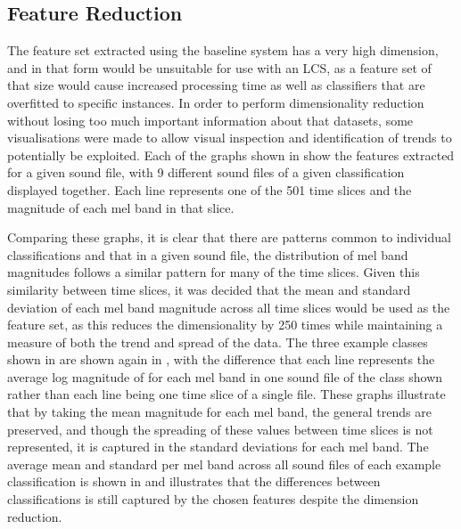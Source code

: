 \documentclass[11pt]{article}
\begin{document}
\begin{multicols}{2}
\subsection{Feature Reduction}

The feature set extracted using the baseline system has a very high dimension, and in that form would be unsuitable for use with an LCS, as a feature set of that size would cause increased processing time as well as classifiers that are overfitted to specific instances. In order to perform dimensionality reduction without losing too much important information about that datasets, some visualisations were made to allow visual inspection and identification of trends to potentially be exploited. Each of the graphs shown in 
show the features extracted for a given sound file, with 9 different sound files of a given classification displayed together. Each line represents one of the 501 time slices and the magnitude of each mel band in that slice. 

Comparing these graphs, it is clear that there are patterns common to individual classifications and that in a given sound file, the distribution of mel band magnitudes follows a similar pattern for many of the time slices. Given this similarity between time slices, it was decided that the mean and standard deviation of each mel band magnitude across all time slices would be used as the feature set, as this reduces the dimensionality by 250 times while maintaining a measure of both the trend and spread of the data. The three example classes shown in 
are shown again in 
, 
with the difference that each line represents the average log magnitude of for each mel band in one sound file of the class shown rather than each line being one time slice of a single file. These graphs illustrate that by taking the mean magnitude for each mel band, the general trends are preserved, and though the spreading of these values between time slices is not represented, it is captured in the standard deviations for each mel band. The average mean and standard per mel band across all sound files of each example classification is shown in 
 and illustrates that the differences between classifications is still captured by the chosen features despite the dimension reduction.


\end{multicols}
\end{document}
